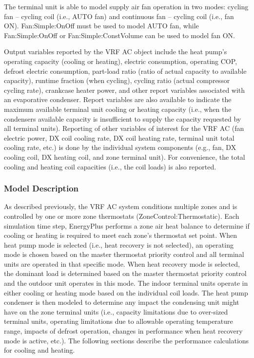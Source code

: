 The terminal unit is able to model supply air fan operation in two modes: cycling fan -- cycling coil (i.e., AUTO fan) and continuous fan -- cycling coil (i.e., fan ON). Fan:Simple:OnOff must be used to model AUTO fan, while Fan:Simple:OnOff or Fan:Simple:ConstVolume can be used to model fan ON.

Output variables reported by the VRF AC object include the heat pump's operating capacity (cooling or heating), electric consumption, operating COP, defrost electric consumption, part-load ratio (ratio of actual capacity to available capacity), runtime fraction (when cycling), cycling ratio (actual compressor cycling rate), crankcase heater power, and other report variables associated with an evaporative condenser. Report variables are also available to indicate the maximum available terminal unit cooling or heating capacity (i.e., when the condensers available capacity is insufficient to supply the capacity requested by all terminal units). Reporting of other variables of interest for the VRF AC (fan electric power, DX coil cooling rate, DX coil heating rate, terminal unit total cooling rate, etc.) is done by the individual system components (e.g., fan, DX cooling coil, DX heating coil, and zone terminal unit). For convenience, the total cooling and heating coil capacities (i.e., the coil loads) is also reported.

\subsubsection{Model Description}\label{model-description-015}

As described previously, the VRF AC system conditions multiple zones and is controlled by one or more zone thermostats (ZoneControl:Thermostatic). Each simulation time step, EnergyPlus performs a zone air heat balance to determine if cooling or heating is required to meet each zone's thermostat set point. When heat pump mode is selected (i.e., heat recovery is not selected), an operating mode is chosen based on the master thermostat priority control and all terminal units are operated in that specific mode. When heat recovery mode is selected, the dominant load is determined based on the master thermostat priority control and the outdoor unit operates in this mode. The indoor terminal units operate in either cooling or heating mode based on the individual coil loads. The heat pump condenser is then modeled to determine any impact the condensing unit might have on the zone terminal units (i.e., capacity limitations due to over-sized terminal units, operating limitations due to allowable operating temperature range, impacts of defrost operation, changes in performance when heat recovery mode is active, etc.). The following sections describe the performance calculations for cooling and heating.

